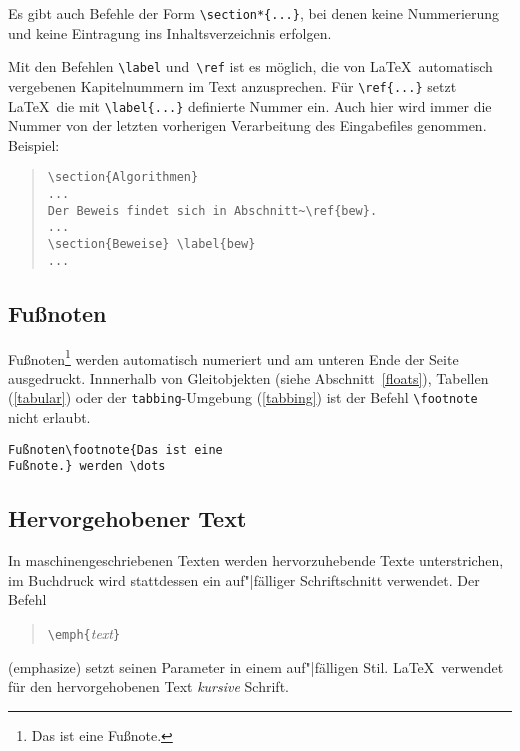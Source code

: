 Es gibt auch Befehle der Form \verb|\section*{...}|, bei denen
keine Nummerierung und keine Eintragung ins Inhaltsverzeichnis
erfolgen.

Mit den Befehlen \verb|\label| und~\verb|\ref| ist es möglich,
die von \LaTeX\ automatisch vergebenen Kapitelnummern im Text
anzusprechen.
Für \verb|\ref{...}| setzt \LaTeX\ die
mit \verb|\label{...}| definierte Nummer ein.
Auch hier wird immer die Nummer von der letzten vorherigen
Verarbeitung des Eingabefiles genommen.
Beispiel:
\begin{quote}
\begin{verbatim}
\section{Algorithmen}
...
Der Beweis findet sich in Abschnitt~\ref{bew}.
...
\section{Beweise} \label{bew}
...
\end{verbatim}
\end{quote}
 
 
\subsection{Fußnoten}
 
Fußnoten\footnote{Das 
ist eine Fußnote.} werden automatisch numeriert
und am unteren Ende der Seite ausgedruckt.  
Innnerhalb von Gleitobjekten (siehe Abschnitt~\ref{floats}), 
Tabellen (\ref{tabular}) oder der \texttt{tabbing}-Umgebung (\ref{tabbing})
ist der Befehl \verb|\footnote| nicht erlaubt.
\exa
~
\exb
\begin{verbatim}
Fußnoten\footnote{Das ist eine
Fußnote.} werden \dots
\end{verbatim}
\exc
 
 
 
\subsection{Hervorgehobener Text}
 
In maschinengeschriebenen Texten werden hervorzuhebende Texte
unterstrichen, im Buchdruck wird stattdessen ein auf"|fälliger
Schriftschnitt verwendet.
Der Befehl 
\begin{quote}
\verb|\emph{|\textit{text}\verb|}| 
\end{quote}
(emphasize) setzt seinen Parameter in einem auf"|fälligen Stil.
\LaTeX\ verwendet für den hervorgehobenen Text \textit{kursive}
Schrift.

